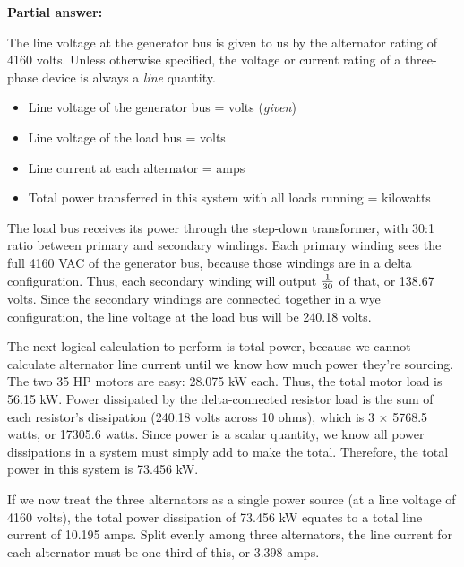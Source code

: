 
\noindent
{\bf Partial answer:}

\vskip 10pt

The line voltage at the generator bus is given to us by the alternator rating of 4160 volts.  Unless otherwise specified, the voltage or current rating of a three-phase device is always a {\it line} quantity.







\begin{itemize}
\item{} Line voltage of the generator bus =  volts ({\it given})
\vskip 10pt
\item{} Line voltage of the load bus =  volts
\vskip 10pt
\item{} Line current at each alternator =  amps 
\vskip 10pt
\item{} Total power transferred in this system with all loads running =  kilowatts 
\end{itemize}

\vskip 10pt

The load bus receives its power through the step-down transformer, with 30:1 ratio between primary and secondary windings.  Each primary winding sees the full 4160 VAC of the generator bus, because those windings are in a delta configuration.  Thus, each secondary winding will output $1 \over 30$ of that, or 138.67 volts.  Since the secondary windings are connected together in a wye configuration, the line voltage at the load bus will be 240.18 volts.

\vskip 10pt

The next logical calculation to perform is total power, because we cannot calculate alternator line current until we know how much power they're sourcing.  The two 35 HP motors are easy: 28.075 kW each.  Thus, the total motor load is 56.15 kW.  Power dissipated by the delta-connected resistor load is the sum of each resistor's dissipation (240.18 volts across 10 ohms), which is 3 $\times$ 5768.5 watts, or 17305.6 watts.  Since power is a scalar quantity, we know all power dissipations in a system must simply add to make the total.  Therefore, the total power in this system is 73.456 kW.

\vskip 10pt

If we now treat the three alternators as a single power source (at a line voltage of 4160 volts), the total power dissipation of 73.456 kW equates to a total line current of 10.195 amps.  Split evenly among three alternators, the line current for each alternator must be one-third of this, or 3.398 amps.





